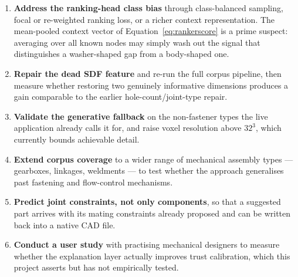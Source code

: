 \documentclass[12pt,oneside,a4paper]{report}
\begin{document}
\begin{enumerate}[leftmargin=2.0cm]
\item \textbf{Address the ranking-head class bias} through class-balanced
sampling, focal or re-weighted ranking loss, or a richer context
representation. The mean-pooled context vector of
Equation~\ref{eq:rankerscore} is a prime suspect: averaging over all known
nodes may simply wash out the signal that distinguishes a washer-shaped gap
from a body-shaped one.
\item \textbf{Repair the dead SDF feature} and re-run the full corpus
pipeline, then measure whether restoring two genuinely informative dimensions
produces a gain comparable to the earlier hole-count/joint-type repair.
\item \textbf{Validate the generative fallback} on the non-fastener types the
live application already calls it for, and raise voxel resolution above
$32^3$, which currently bounds achievable detail.
\item \textbf{Extend corpus coverage} to a wider range of mechanical assembly
types --- gearboxes, linkages, weldments --- to test whether the approach
generalises past fastening and flow-control mechanisms.
\item \textbf{Predict joint constraints, not only components}, so that a
suggested part arrives with its mating constraints already proposed and can
be written back into a native CAD file.
\item \textbf{Conduct a user study} with practising mechanical designers to
measure whether the explanation layer actually improves trust calibration,
which this project asserts but has not empirically tested.
\end{enumerate}
\end{document}
